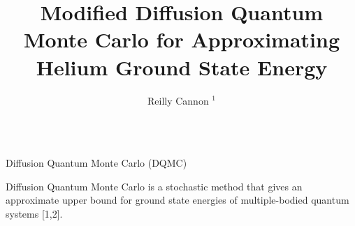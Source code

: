 \documentclass[final]{beamer}
\title{Modified Diffusion Quantum Monte Carlo for Approximating Helium Ground State Energy} %
\author{Reilly Cannon $^{1}$} %
\institute{$^{1}$ Reed College, Portland, Oregon} %
\newlength{\sepwid}
\newlength{\onecolwid}
\begin{document}

\setlength{\belowcaptionskip}{2ex} %
\setlength\belowdisplayshortskip{2ex} %

\begin{frame}[t] %

\begin{columns}[t] %


\begin{column}{\onecolwid} %





\begin{block}{Diffusion Quantum Monte Carlo (DQMC)}

{

Diffusion Quantum Monte Carlo is a stochastic method that gives an approximate upper bound for ground state energies of multiple-bodied quantum systems [1,2].
}
\end{block}
\begin{block}


\end{block}
\end{column}
\end{columns}
\end{frame}
\end{document}

